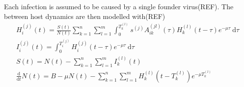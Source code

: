 \documentclass[DIV=15]{scrartcl}
\begin{document}

 
  

  



Each infection is  assumed to be caused  by a single founder virus(REF). The between host dynamics are  then modelled  with(REF)
\begin{gather*}
H^{(j)}_{i}(t) = \frac{S(t)}{N(t)}  \sum_{k=1}^n \sum_{l=1}^m  \int_0^{T^{(l)}_{k}} s^{(j)} A^{(jl)}_{ik}(\tau) H^{(l)}_{k}(t-\tau)e^{-\mu \tau} \ \text{d}\tau \\
I_i^{(j)}(t) = \int_0^{T_i^{(j)}}  H_i^{(j)}(t-\tau)e^{-\mu \tau} \  \text{d}\tau \\
S(t) = N(t) -  \sum_{k=1}^n \sum_{l=1}^m  I^{(l)}_k(t) \\
\frac{\text{d}}{\text{d} t}  N(t) = B- \mu N(t) -\sum_{k=1}^n \sum_{l=1}^m  H_k^{(l)}(t-T_k^{(l)})e^{-\mu T_k^{(l)}} 
\end{gather*}
\end{document}
